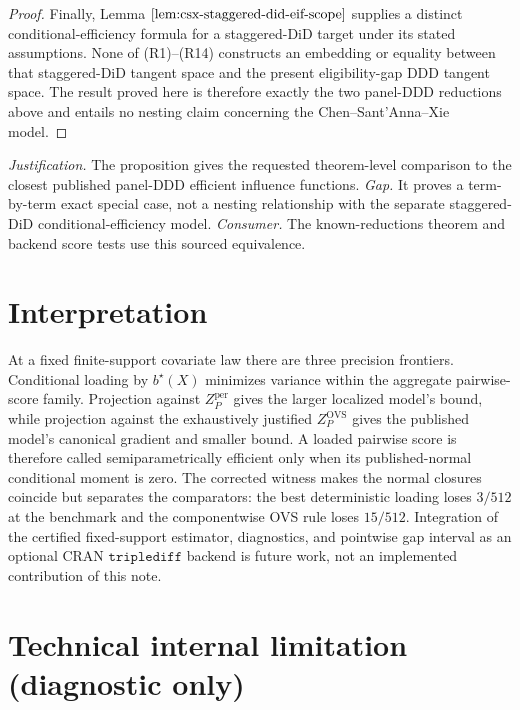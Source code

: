 \documentclass{article}
\begin{document}
\begin{proof}
Finally, Lemma \(\ref{lem:csx-staggered-did-eif-scope}\) supplies a distinct conditional-efficiency formula for a staggered-DiD target under its stated assumptions.  None of (R1)--(R14) constructs an embedding or equality between that staggered-DiD tangent space and the present eligibility-gap DDD tangent space.  The result proved here is therefore exactly the two panel-DDD reductions above and entails no nesting claim concerning the Chen--Sant'Anna--Xie model.
\end{proof}
\par\smallskip\noindent \textit{Justification.} The proposition gives the requested theorem-level comparison to the closest published panel-DDD efficient influence functions. \textit{Gap.} It proves a term-by-term exact special case, not a nesting relationship with the separate staggered-DiD conditional-efficiency model. \textit{Consumer.} The known-reductions theorem and backend score tests use this sourced equivalence.

\section{Interpretation}

At a fixed finite-support covariate law there are three precision frontiers.  Conditional loading by \(b^\star(X)\) minimizes variance within the aggregate pairwise-score family.  Projection against \(Z_P^{\mathrm{per}}\) gives the larger localized model's bound, while projection against the exhaustively justified \(Z_P^{\mathrm{OVS}}\) gives the published model's canonical gradient and smaller bound.  A loaded pairwise score is therefore called semiparametrically efficient only when its published-normal conditional moment is zero.  The corrected witness makes the normal closures coincide but separates the comparators: the best deterministic loading loses \(3/512\) at the benchmark and the componentwise OVS rule loses \(15/512\).  Integration of the certified fixed-support estimator, diagnostics, and pointwise gap interval as an optional CRAN \(\texttt{triplediff}\) backend is future work, not an implemented contribution of this note.

\section*{Technical internal limitation (diagnostic only)}
\end{document}
